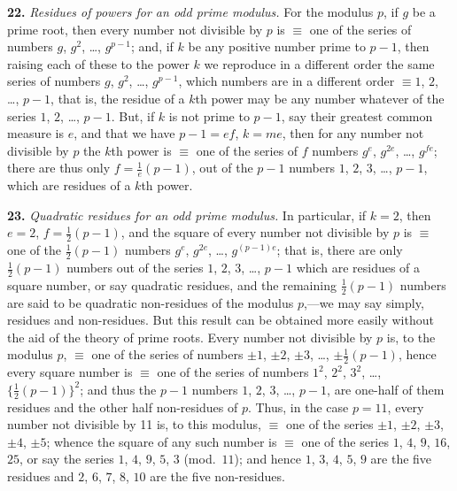 \documentclass[11pt,a4paper]{article}
\begin{document}
\textbf{22.}\quad
\textit{Residues of powers for an odd prime modulus.} For the modulus $p$, if $g$ be a prime root, then every number not divisible by $p$ is $\equiv$ one of the series of numbers $g$, $g^{2}$, \ldots, $g^{p-1}$; and, if $k$ be any positive number prime to $p - 1$, then raising each of these to the power $k$ we reproduce in a different order the same series of numbers $g$, $g^{2}$, \ldots, $g^{p-1}$, which numbers are in a different order $\equiv 1$, $2$, \ldots, $p - 1$, that is, the residue of a $k$th power may be any number whatever of the series $1$, $2$, \ldots, $p - 1$. But, if $k$ is not prime to $p - 1$, say their greatest common measure is $e$, and that we have $p - 1 = ef$, $k = me$, then for any number not divisible by $p$ the $k$th power is $\equiv$ one of the series of $f$ numbers $g^{e}$, $g^{2e}$, \ldots, $g^{fe}$; there are thus only $f = \frac{1}{e}(p - 1)$, out of the $p - 1$ numbers $1$, $2$, $3$, \ldots, $p - 1$, which are residues of a $k$th power.

\textbf{23.}\quad
\textit{Quadratic residues for an odd prime modulus.} In particular, if $k = 2$, then $e = 2$, $f = \frac{1}{2}(p - 1)$, and the square of every number not divisible by $p$ is $\equiv$ one of the $\frac{1}{2}(p - 1)$ numbers $g^{e}$, $g^{2e}$, \ldots, $g^{(p-1)e}$; that is, there are only $\frac{1}{2}(p - 1)$ numbers out of the series $1$, $2$, $3$, \ldots, $p - 1$ which are residues of a square number, or say quadratic residues, and the remaining $\frac{1}{2}(p - 1)$ numbers are said to be quadratic non-residues of the modulus $p$,---we may say simply, residues and non-residues. But this result can be obtained more easily without the aid of the theory of prime roots. Every number not divisible by $p$ is, to the modulus $p$, $\equiv$ one of the series of numbers $\pm 1$, $\pm 2$, $\pm 3$, \ldots, $\pm \frac{1}{2}(p - 1)$, hence every square number is $\equiv$ one of the series of numbers $1^{2}$, $2^{2}$, $3^{2}$, \ldots, $\{\frac{1}{2}(p - 1)\}^{2}$; and thus the $p - 1$ numbers $1$, $2$, $3$, \ldots, $p - 1$, are one-half of them residues and the other half non-residues of $p$. Thus, in the case $p = 11$, every number not divisible by 11 is, to this modulus, $\equiv$ one of the series $\pm 1$, $\pm 2$, $\pm 3$, $\pm 4$, $\pm 5$; whence the square of any such number is $\equiv$ one of the series $1$, $4$, $9$, $16$, $25$, or say the series $1$, $4$, $9$, $5$, $3$ (mod.\ $11$); and hence $1$, $3$, $4$, $5$, $9$ are the five residues and $2$, $6$, $7$, $8$, $10$ are the five non-residues.
\end{document}
